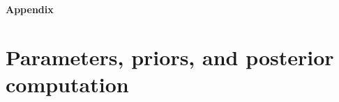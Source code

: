 
\clearpage
\begin{center}
  {\Huge\bfseries Appendix}
\end{center}
\vspace{1.5em}
\appendix

\section{Parameters, priors, and posterior computation}
\label{sec:inference}

